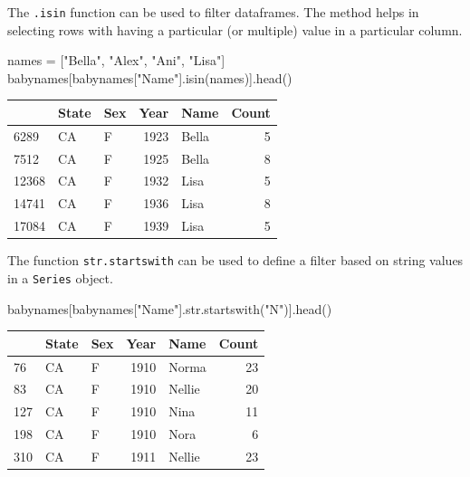 \documentclass[
  letterpaper,
  DIV=11,
  numbers=noendperiod]{scrreprt}
\newenvironment{Shaded}{\begin{snugshade}}{\end{snugshade}}
\newcommand{\BuiltInTok}[1]{\textcolor[rgb]{0.00,0.23,0.31}{#1}}
\newcommand{\NormalTok}[1]{\textcolor[rgb]{0.00,0.23,0.31}{#1}}
\newcommand{\OperatorTok}[1]{\textcolor[rgb]{0.37,0.37,0.37}{#1}}
\newcommand{\StringTok}[1]{\textcolor[rgb]{0.13,0.47,0.30}{#1}}
\begin{document}
The \texttt{.isin} function can be used to filter dataframes. The method
helps in selecting rows with having a particular (or multiple) value in
a particular column.

\begin{Shaded}
\begin{Highlighting}[]
\NormalTok{names }\OperatorTok{=}\NormalTok{ [}\StringTok{"Bella"}\NormalTok{, }\StringTok{"Alex"}\NormalTok{, }\StringTok{"Ani"}\NormalTok{, }\StringTok{"Lisa"}\NormalTok{]}
\NormalTok{babynames[babynames[}\StringTok{"Name"}\NormalTok{].isin(names)].head()}
\end{Highlighting}
\end{Shaded}

\begin{tabular}{lllrlr}
\toprule
{} & State & Sex &  Year &   Name &  Count \\
\midrule
6289  &    CA &   F &  1923 &  Bella &      5 \\
7512  &    CA &   F &  1925 &  Bella &      8 \\
12368 &    CA &   F &  1932 &   Lisa &      5 \\
14741 &    CA &   F &  1936 &   Lisa &      8 \\
17084 &    CA &   F &  1939 &   Lisa &      5 \\
\bottomrule
\end{tabular}

The function \texttt{str.startswith} can be used to define a filter
based on string values in a \texttt{Series} object.

\begin{Shaded}
\begin{Highlighting}[]
\NormalTok{babynames[babynames[}\StringTok{"Name"}\NormalTok{].}\BuiltInTok{str}\NormalTok{.startswith(}\StringTok{"N"}\NormalTok{)].head()}
\end{Highlighting}
\end{Shaded}

\begin{tabular}{lllrlr}
\toprule
{} & State & Sex &  Year &    Name &  Count \\
\midrule
76  &    CA &   F &  1910 &   Norma &     23 \\
83  &    CA &   F &  1910 &  Nellie &     20 \\
127 &    CA &   F &  1910 &    Nina &     11 \\
198 &    CA &   F &  1910 &    Nora &      6 \\
310 &    CA &   F &  1911 &  Nellie &     23 \\
\bottomrule
\end{tabular}
\end{document}
